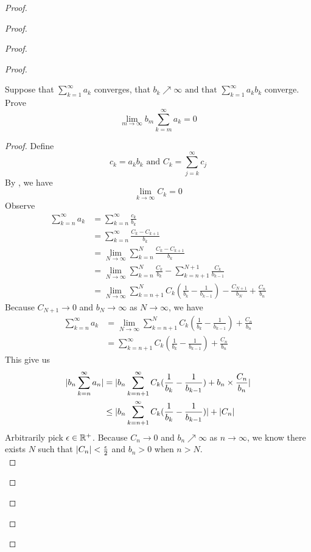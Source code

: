 \documentclass{report}
\begin{document}
\begin{proof}
\begin{proof}
\begin{proof}
\begin{proof}
\begin{question}{}{}
Suppose that $\sum_{k=1}^{\infty} a_k $ converges, that $b_k \nearrow \infty \text{ and that }\sum_{k=1}^{\infty} a_k b_k $
converge. Prove
\begin{equation}
\lim_{m\to\infty}b_m\sum_{k=m}^\infty a_k=0
\end{equation}
\end{question}
\begin{proof}
Define
\begin{equation}
c_k=a_kb_k\text{ and }C_k=\sum_{j=k}^\infty c_j
\end{equation}
By , we have
\begin{equation}
\lim_{k\to\infty}C_k=0
\end{equation}
Observe
\begin{align}
  \sum_{k=n}^\infty a_k&=\sum_{k= n}^\infty \frac{c_k}{b_k}\\
  &=\sum_{k=n}^\infty \frac{C_k-C_{k+1}}{b_k}\\
  &=\lim_{N\to\infty}\sum^N_{k=n} \frac{C_k-C_{k+1}}{b_k}\\
  &=\lim_{N\to\infty}\sum_{k=n}^N \frac{C_k}{b_k}-\sum_{k=n+1}^{N+1}\frac{C_k}{b_{k-1}}\\
  &=\lim_{N\to\infty} \sum_{k=n+1}^{N} C_k(\frac{1}{b_k}-\frac{1}{b_{k-1}})-\frac{C_{N+1}}{b_N}+\frac{C_n}{b_n}
\end{align}
Because $C_{N+1}\to 0$ and $b_N\to \infty$ as $N\to\infty$, we have
\begin{align}
\sum_{k=n}^\infty a_k&=\lim_{N\to\infty}\sum_{k=n+1}^N C_k(\frac{1}{b_k}-\frac{1}{b_{k-1}})+\frac{C_n}{b_n}\\
&=\sum_{k=n+1}^\infty C_k(\frac{1}{b_k}-\frac{1}{b_{k-1}})+\frac{C_n}{b_n}
\end{align}
This give us
\begin{align}
|b_n\sum_{k=n}^\infty a_n|&=|b_n \sum_{k=n+1}^\infty C_k(\frac{1}{b_k}-\frac{1}{b_{k-1}})+b_n\times \frac{C_n}{b_n}|\\
&\leq |b_n\sum_{k=n+1}^\infty C_k (\frac{1}{b_k}-\frac{1}{b_{k-1}})|+|C_n|
\end{align}
Arbitrarily pick $\epsilon \in\mathbb{R}^+$. Because $C_n\to 0$ and $b_n\nearrow \infty$ as $n\to\infty$, we know there exists $N$ such that  $|C_n|<\frac{\epsilon}{2}$  and $b_n>0$ when $n>N$.\\


\end{proof}
\end{proof}
\end{proof}
\end{proof}
\end{proof}
\end{document}
